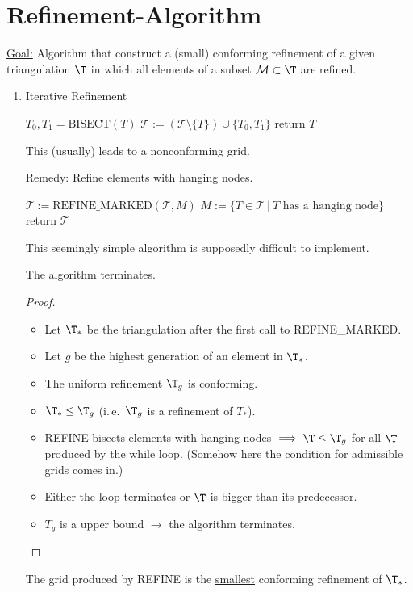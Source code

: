 \section{Refinement-Algorithm}
\underline{Goal:} Algorithm that construct a (small) conforming refinement of a given triangulation $\T$ in which all elements of a subset $\mathcal{M} \subset \T$ are refined.
\begin{enumerate}[label = \alph*)]
	\item Iterative Refinement
    \begin{algorithmic}[0]
        \State ${T_0, T_1} = \text{BISECT} (T)$
          \State $\mathcal{T} := (\mathcal{T} \setminus \{T\}) \cup \{T_0, T_1\}$
        \EndFor
        \State return $T$
      \EndFunction
    \end{algorithmic}
    This (usually) leads to a nonconforming grid.

		Remedy: Refine elements with hanging nodes.
    \begin{algorithmic}[0]
          \State $\mathcal{T} := \text{REFINE\_MARKED}(\mathcal{T}, M)$
          \State $M := \{T \in \mathcal{T} \ |\ T \text{ has a hanging node}\}$
        \EndWhile
        \State return $\mathcal{T}$
      \EndFunction
    \end{algorithmic}
    This seemingly simple algorithm is supposedly difficult to implement.
		\begin{lemma}
			The algorithm terminates.
    \end{lemma}
    \begin{proof}
			\begin{itemize}
				\item Let $\T_{*}$ be the triangulation after the first call to REFINE\_MARKED.
				\item Let $g$ be the highest generation of an element in $\T_{*}$. 
				\item The uniform refinement $\T_{g}$ is conforming.
				\item $\T_{*}\leq \T_{g}$ (i.\,e.\ $\T_{g}$ is a refinement of $T_{*}$).
        \item REFINE bisects elements with hanging nodes $\implies \T \leq \T_{g}$ for all $\T$ produced by the \glqq while\grqq{} loop. (Somehow here the condition for admissible grids comes in.)
				\item Either the loop terminates or $\T$ is bigger than its predecessor.
				\item $T_{g}$ is a upper bound $\to$ the algorithm terminates.
			\end{itemize}
		\end{proof}
		\begin{lemma}
			The grid produced by REFINE
			is the \underline{smallest} conforming refinement of $\T_{*}$.
		\end{lemma}

\end{enumerate}
